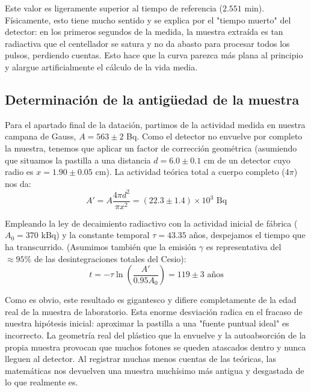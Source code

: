 \documentclass[9pt,a4paper,twocolumn,twoside]{rho-class/rho}
\begin{document}
Este valor es ligeramente superior al tiempo de referencia ($2.551$ min). Físicamente, esto tiene mucho sentido y se explica por el "tiempo muerto" del detector: en los primeros segundos de la medida, la muestra extraída es tan radiactiva que el centellador se satura y no da abasto para procesar todos los pulsos, perdiendo cuentas. Esto hace que la curva parezca más plana al principio y alargue artificialmente el cálculo de la vida media.

\subsection{Determinación de la antigüedad de la muestra}

Para el apartado final de la datación, partimos de la actividad medida en nuestra campana de Gauss, $A = 563 \pm 2$ Bq.
Como el detector no envuelve por completo la muestra, tenemos que aplicar un factor de corrección geométrica (asumiendo que situamos la pastilla a una distancia $d = 6.0 \pm 0.1$ cm de un detector cuyo radio es $x = 1.90 \pm 0.05$ cm). La actividad teórica total a cuerpo completo ($4\pi$) nos da:
\vspace{0.2cm}
\begin{equation*}
    A' = A \frac{4\pi d^2}{\pi x^2} = (22.3 \pm 1.4) \times 10^3 \text{ Bq}
\end{equation*}
\vspace{0.2cm}

Empleando la ley de decaimiento radiactivo con la actividad inicial de fábrica ($A_0 = 370$ kBq) y la constante temporal $\tau = 43.35$ años, despejamos el tiempo que ha transcurrido. (Asumimos también que la emisión $\gamma$ es representativa del $\approx 95\%$ de las desintegraciones totales del Cesio):
\vspace{0.2cm}
\begin{equation*}
    t = -\tau \ln\left(\frac{A'}{0.95 A_0}\right) = 119 \pm 3 \text{ años}
\end{equation*}
\vspace{0.2cm}

Como es obvio, este resultado es gigantesco y difiere completamente de la edad real de la muestra de laboratorio. Esta enorme desviación radica en el fracaso de nuestra hipótesis inicial: aproximar la pastilla a una "fuente puntual ideal" es incorrecto. La geometría real del plástico que la envuelve y la autoabsorción de la propia muestra provocan que muchos fotones se queden atascados dentro y nunca lleguen al detector. Al registrar muchas menos cuentas de las teóricas, las matemáticas nos devuelven una muestra muchísimo más antigua y desgastada de lo que realmente es.
\end{document}
